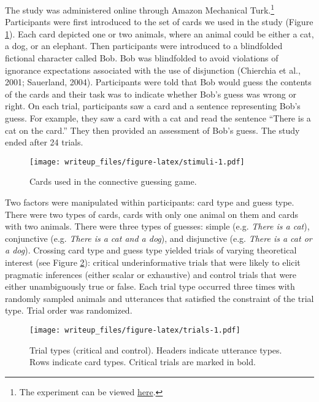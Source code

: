 \documentclass[man]{apa6}
\theoremstyle{definition}
\theoremstyle{definition}
\theoremstyle{definition}
\theoremstyle{remark}
\begin{document}
The study was administered online through Amazon Mechanical
Turk.\footnote{The experiment can be viewed
  \href{https://cdn.rawgit.com/thegricean/si-paradigms/94a590f0/experiments/main/1_methods/online_experiment/connective_game.html}{here}.}
Participants were first introduced to the set of cards we used in the
study (Figure \ref{fig:stimuli}). Each card depicted one or two animals,
where an animal could be either a cat, a dog, or an elephant. Then
participants were introduced to a blindfolded fictional character called
Bob. Bob was blindfolded to avoid violations of ignorance expectations
associated with the use of disjunction (Chierchia et al., 2001;
Sauerland, 2004). Participants were told that Bob would guess the
contents of the cards and their task was to indicate whether Bob's guess
was wrong or right. On each trial, participants saw a card and a
sentence representing Bob's guess. For example, they saw a card with a
cat and read the sentence \enquote{There is a cat on the card.} They
then provided an assessment of Bob's guess. The study ended after 24
trials.

\begin{figure}
\centering
\texttt{[image: writeup\_files/figure-latex/stimuli-1.pdf]}
\caption{\label{fig:stimuli}Cards used in the connective guessing game.}
\end{figure}

Two factors were manipulated within participants: card type and guess
type. There were two types of cards, cards with only one animal on them
and cards with two animals. There were three types of guesses: simple
(e.g. \emph{There is a cat}), conjunctive (e.g. \emph{There is a cat and
a dog}), and disjunctive (e.g. \emph{There is a cat or a dog}). Crossing
card type and guess type yielded trials of varying theoretical interest
(see Figure \ref{fig:trials}): critical underinformative trials that
were likely to elicit pragmatic inferences (either scalar or exhaustive)
and control trials that were either unambiguously true or false. Each
trial type occurred three times with randomly sampled animals and
utterances that satisfied the constraint of the trial type. Trial order
was randomized.

\begin{figure}
\centering
\texttt{[image: writeup\_files/figure-latex/trials-1.pdf]}
\caption{\label{fig:trials}Trial types (critical and control). Headers
indicate utterance types. Rows indicate card types. Critical trials are
marked in bold.}
\end{figure}
\end{document}
